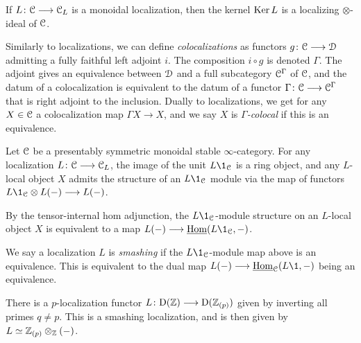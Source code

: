 \begin{remark}
    If $L\colon \EuScript{C}\longrightarrow \EuScript{C}_L$ is a monoidal localization, then the kernel $\operatorname{Ker} L$ is a localizing $\otimes$-ideal of $\EuScript{C}$. 
\end{remark}

\begin{remark}
    Similarly to localizations, we can define \emph{colocalizations} as functors $g\colon \EuScript{C}\longrightarrow \EuScript{D}$ admitting a fully faithful left adjoint $i$. The composition $i\circ g$ is denoted $\Gamma$. The adjoint gives an equivalence between $\EuScript{D}$ and a full subcategory $\EuScript{C}^\Gamma$ of $\EuScript{C}$, and the datum of a colocalization is equivalent to the datum of a functor $\Gamma\colon \EuScript{C}\longrightarrow \EuScript{C}^\Gamma$ that is right adjoint to the inclusion. Dually to localizations, we get for any $X\in \EuScript{C}$ a colocalization map $\Gamma X\to X$, and we say $X$ is \emph{$\Gamma$-colocal} if this is an equivalence. 
\end{remark}

Let $\EuScript{C}$ be a presentably symmetric monoidal stable $\infty$-category. For any localization $L\colon \EuScript{C}\longrightarrow \EuScript{C}_L$, the image of the unit $L\1_\C$ is a ring object, and any $L$-local object $X$ admits the structure of an $L\1_\C$ module via the map of functors $L\1_\C \otimes L(-)\longrightarrow L(-)$. 

\begin{remark}
    \label{ch0:rm:L1-module-adjoint-map}
    By the tensor-internal hom adjunction, the $L\1_\C$-module structure on an $L$-local object $X$ is equivalent to a map $L(-)\longrightarrow \iHom(L\1_\C,-)$. 
\end{remark}

\begin{definition}
    \label{ch0:def:smashing-localization}
    We say a localization $L$ is \emph{smashing} if the $L\1_\C$-module map above is an equivalence. This is equivalent to the dual map $L(-)\longrightarrow \iHom_\C(L\1, -)$ being an equivalence. 
\end{definition}

\begin{example}
    \label{ch0:ex:p-localization-ab-smashing}
    There is a $p$-localization functor $L\colon\mathrm{D}(\mathbb{Z})\longrightarrow \mathrm{D}(\mathbb{Z}_{(p)})$ given by inverting all primes $q\neq p$. This is a smashing localization, and is then given by $L \simeq \mathbb{Z}_{(p)}\otimes_{\mathbb{Z}} (-)$. 
\end{example}

